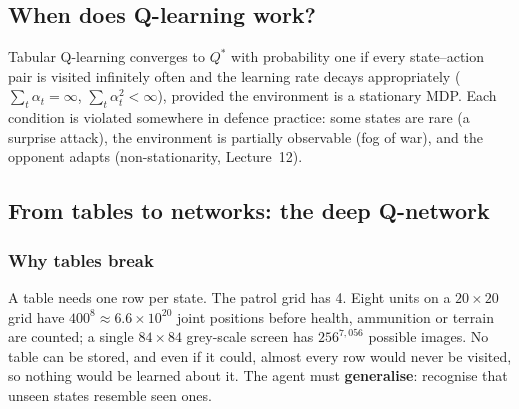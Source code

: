 \documentclass[11pt]{article}
\begin{document}
\subsection{When does Q-learning work?}
Tabular Q-learning converges to $Q^*$ with probability one if every state--action pair is visited infinitely often and the learning rate decays appropriately ($\sum_t\alpha_t=\infty$, $\sum_t\alpha_t^2<\infty$), provided the environment is a stationary MDP. Each condition is violated somewhere in defence practice: some states are rare (a surprise attack), the environment is partially observable (fog of war), and the opponent adapts (non-stationarity, Lecture~12).

\subsection{From tables to networks: the deep Q-network}
\subsubsection{Why tables break}
A table needs one row per state. The patrol grid has 4. Eight units on a $20\times20$ grid have $400^8\approx6.6\times10^{20}$ joint positions before health, ammunition or terrain are counted; a single $84\times84$ grey-scale screen has $256^{7{,}056}$ possible images. No table can be stored, and even if it could, almost every row would never be visited, so nothing would be learned about it. The agent must \textbf{generalise}: recognise that unseen states resemble seen ones.
\end{document}
